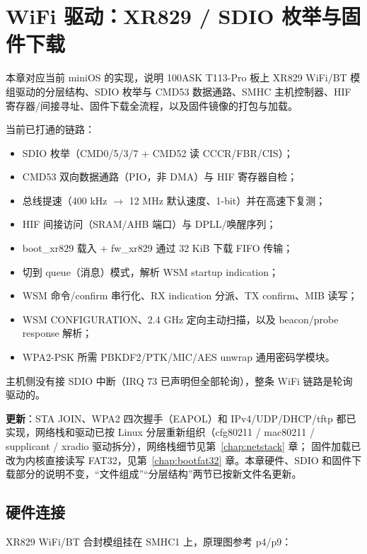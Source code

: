 \chapter{WiFi 驱动：XR829 / SDIO 枚举与固件下载}
\label{chap:wifi}

本章对应当前 miniOS 的实现，说明 100ASK T113-Pro 板上 XR829 WiFi/BT 模组驱动的分层结构、SDIO 枚举与 CMD53 数据通路、SMHC 主机控制器、HIF 寄存器/间接寻址、固件下载全流程，以及固件镜像的打包与加载。

当前已打通的链路：

\begin{itemize}
  \item SDIO 枚举（CMD0/5/3/7 + CMD52 读 CCCR/FBR/CIS）；
  \item CMD53 双向数据通路（PIO，非 DMA）与 HIF 寄存器自检；
  \item 总线提速（400 kHz $\rightarrow$ 12 MHz 默认速度、1-bit）并在高速下复测；
  \item HIF 间接访问（SRAM/AHB 端口）与 DPLL/唤醒序列；
  \item boot\_xr829 载入 + fw\_xr829 通过 32 KiB 下载 FIFO 传输；
  \item 切到 queue（消息）模式，解析 WSM startup indication；
  \item WSM 命令/confirm 串行化、RX indication 分派、TX confirm、MIB 读写；
  \item WSM CONFIGURATION、2.4 GHz 定向主动扫描，以及 beacon/probe response 解析；
  \item WPA2-PSK 所需 PBKDF2/PTK/MIC/AES unwrap 通用密码学模块。
\end{itemize}

主机侧没有接 SDIO 中断（IRQ 73 已声明但全部轮询），整条 WiFi 链路是轮询驱动的。

\textbf{更新}：STA JOIN、WPA2 四次握手（EAPOL）和 IPv4/UDP/DHCP/tftp 都已实现，网络栈和驱动已按 Linux 分层重新组织（cfg80211 / mac80211 / supplicant / xradio 驱动拆分），网络栈细节见第~\ref{chap:netstack} 章； 固件加载已改为内核直接读写 FAT32，见第~\ref{chap:bootfat32} 章。本章硬件、SDIO 和固件下载部分的说明不变，``文件组成''``分层结构''两节已按新文件名更新。

\section{硬件连接}

XR829 WiFi/BT 合封模组挂在 SMHC1 上，原理图参考  p4/p9：

